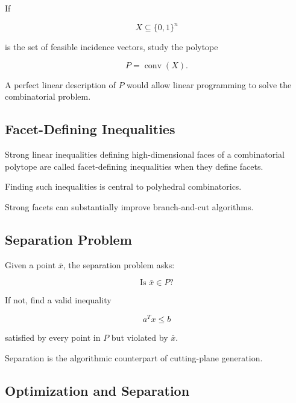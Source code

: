 If

\[
X
\subseteq
\{0,1\}^n
\]

is the set of feasible incidence vectors, study the polytope

\[
\boxed{
P
=
\operatorname{conv}(X).
}
\]

A perfect linear description of \(P\) would allow linear programming to
solve the combinatorial problem.

\subsection{Facet-Defining Inequalities}
\label{subsec:facet-defining-inequalities}

Strong linear inequalities defining high-dimensional faces of a
combinatorial polytope are called facet-defining inequalities when they
define facets.

Finding such inequalities is central to polyhedral combinatorics.

Strong facets can substantially improve branch-and-cut algorithms.

\subsection{Separation Problem}
\label{subsec:combinatorial-separation-problem}

Given a point \(\bar{x}\), the separation problem asks:

\[
\boxed{
\text{Is }\bar{x}\in P?
}
\]

If not, find a valid inequality

\[
\boxed{
a^Tx\leq b
}
\]

satisfied by every point in \(P\) but violated by \(\bar{x}\).

Separation is the algorithmic counterpart of cutting-plane generation.

\subsection{Optimization and Separation}
\label{subsec:optimization-separation}

